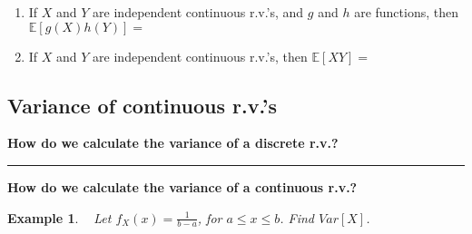 \documentclass[12pt]{amsart}
\newtheorem{example}[theorem]{Example}
\newcommand\Ebb{\mathbb{E}}
\newcommand\pdfX{f_X(x)}
\begin{document}
{\begin{enumerate}
\vspace{6cm}

\item If $X$ and $Y$ are independent continuous r.v.'s, and $g$ and $h$ are functions, then $\Ebb[g(X)h(Y)] = $


\vfill

\item If $X$ and $Y$ are independent continuous r.v.'s,  then \newline $\Ebb[XY] = $

\vspace{1cm}
\end{enumerate}

\newpage

\subsection{Variance of continuous r.v.'s}\hspace*{\fill}%

\vspace{.5cm}


\textbf{How do we calculate the variance of a discrete r.v.?}


\vspace{5cm}
\hrule
\vspace{.5cm}



\textbf{How do we calculate the variance of a continuous r.v.?}





\newpage

\begin{example}\label{29_V_Uab}\ \newline
Let $\pdfX = \frac{1}{b-a}$, for $a \leq x \leq b$. Find $Var[X]$.


\end{example}}
\end{document}
